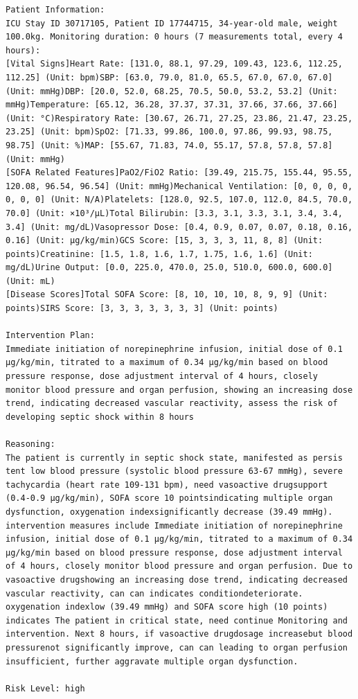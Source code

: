 \documentclass{article}
\begin{document}
\begin{lstlisting}[caption={Result for Patient 30717105}, label={lst:30717105}]
Patient Information:
ICU Stay ID 30717105, Patient ID 17744715, 34-year-old male, weight 100.0kg. Monitoring duration: 0 hours (7 measurements total, every 4 hours):
[Vital Signs]Heart Rate: [131.0, 88.1, 97.29, 109.43, 123.6, 112.25, 112.25] (Unit: bpm)SBP: [63.0, 79.0, 81.0, 65.5, 67.0, 67.0, 67.0] (Unit: mmHg)DBP: [20.0, 52.0, 68.25, 70.5, 50.0, 53.2, 53.2] (Unit: mmHg)Temperature: [65.12, 36.28, 37.37, 37.31, 37.66, 37.66, 37.66] (Unit: °C)Respiratory Rate: [30.67, 26.71, 27.25, 23.86, 21.47, 23.25, 23.25] (Unit: bpm)SpO2: [71.33, 99.86, 100.0, 97.86, 99.93, 98.75, 98.75] (Unit: %)MAP: [55.67, 71.83, 74.0, 55.17, 57.8, 57.8, 57.8] (Unit: mmHg)
[SOFA Related Features]PaO2/FiO2 Ratio: [39.49, 215.75, 155.44, 95.55, 120.08, 96.54, 96.54] (Unit: mmHg)Mechanical Ventilation: [0, 0, 0, 0, 0, 0, 0] (Unit: N/A)Platelets: [128.0, 92.5, 107.0, 112.0, 84.5, 70.0, 70.0] (Unit: ×10³/μL)Total Bilirubin: [3.3, 3.1, 3.3, 3.1, 3.4, 3.4, 3.4] (Unit: mg/dL)Vasopressor Dose: [0.4, 0.9, 0.07, 0.07, 0.18, 0.16, 0.16] (Unit: μg/kg/min)GCS Score: [15, 3, 3, 3, 11, 8, 8] (Unit: points)Creatinine: [1.5, 1.8, 1.6, 1.7, 1.75, 1.6, 1.6] (Unit: mg/dL)Urine Output: [0.0, 225.0, 470.0, 25.0, 510.0, 600.0, 600.0] (Unit: mL)
[Disease Scores]Total SOFA Score: [8, 10, 10, 10, 8, 9, 9] (Unit: points)SIRS Score: [3, 3, 3, 3, 3, 3, 3] (Unit: points)

Intervention Plan:
Immediate initiation of norepinephrine infusion, initial dose of 0.1 μg/kg/min, titrated to a maximum of 0.34 μg/kg/min based on blood pressure response, dose adjustment interval of 4 hours, closely monitor blood pressure and organ perfusion, showing an increasing dose trend, indicating decreased vascular reactivity, assess the risk of developing septic shock within 8 hours

Reasoning:
The patient is currently in septic shock state, manifested as persis tent low blood pressure (systolic blood pressure 63-67 mmHg), severe tachycardia (heart rate 109-131 bpm), need vasoactive drugsupport (0.4-0.9 μg/kg/min), SOFA score 10 pointsindicating multiple organ dysfunction, oxygenation indexsignificantly decrease (39.49 mmHg). intervention measures include Immediate initiation of norepinephrine infusion, initial dose of 0.1 μg/kg/min, titrated to a maximum of 0.34 μg/kg/min based on blood pressure response, dose adjustment interval of 4 hours, closely monitor blood pressure and organ perfusion. Due to vasoactive drugshowing an increasing dose trend, indicating decreased vascular reactivity, can can indicates conditiondeteriorate. oxygenation indexlow (39.49 mmHg) and SOFA score high (10 points) indicates The patient in critical state, need continue Monitoring and intervention. Next 8 hours, if vasoactive drugdosage increasebut blood pressurenot significantly improve, can can leading to organ perfusion insufficient, further aggravate multiple organ dysfunction.

Risk Level: high
\end{lstlisting}
\end{document}
